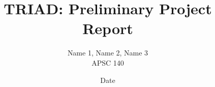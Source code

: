 \documentclass{article}
\title{TRIAD: Preliminary Project Report}
\author{Name 1, Name 2, Name 3 \\ APSC 140}
\date{Date}
\begin{document}
\maketitle

\section{}

\section{}

\section{}

\section{}
\end{document}
